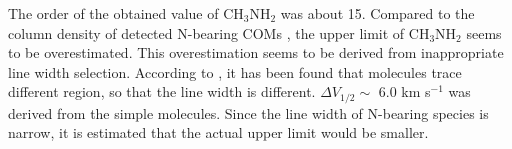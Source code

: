 The order of the obtained value of CH$_{3}$NH$_{2}$ was about 15.
Compared to the column density of detected N-bearing COMs 
\citep[e.g., 1.2$\sim$1.9 $\times$ 10$^{14}$ cm$^{-2}$ for NH$_2$CHO,][]{Oya+2017}, 
the upper limit of CH$_{3}$NH$_{2}$ seems to be overestimated.
This overestimation seems to be derived from inappropriate line width selection.
According to \citet{Oya+2017}, it has been found that molecules trace different region, so that the line width is different. 
$\Delta V_{1/2} \sim$ 6.0 km s$^{-1}$ was derived from the simple molecules.
Since the line width of N-bearing species is narrow, it is estimated that the actual upper limit would be smaller.